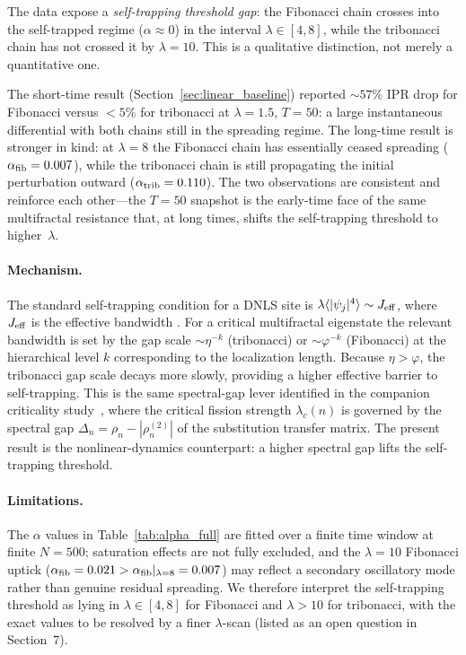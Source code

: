 The data expose a \emph{self-trapping threshold gap}: the Fibonacci
chain crosses into the self-trapped regime ($\alpha \approx 0$) in the
interval $\lambda \in [4, 8]$, while the tribonacci chain has not
crossed it by $\lambda = 10$. This is a qualitative distinction, not
merely a quantitative one.

The short-time result (Section~\ref{sec:linear_baseline}) reported
$\sim\!57\%$ IPR drop for Fibonacci versus $<\!5\%$ for tribonacci at
$\lambda=1.5$, $T=50$: a large instantaneous differential with both
chains still in the spreading regime. The long-time result is stronger
in kind: at $\lambda = 8$ the Fibonacci chain has essentially ceased
spreading ($\alpha_{\rm fib} = 0.007$), while the tribonacci chain is
still propagating the initial perturbation outward
($\alpha_{\rm trib} = 0.110$). The two observations are consistent and
reinforce each other---the $T=50$ snapshot is the early-time face of
the same multifractal resistance that, at long times, shifts the
self-trapping threshold to higher~$\lambda$.

\paragraph{Mechanism.}
The standard self-trapping condition for a DNLS site is
$\lambda \langle |\psi_j|^4 \rangle \sim J_{\rm eff}$, where
$J_{\rm eff}$ is the effective bandwidth
\cite{Eilbeck1985,Kevrekidis2009}. For a critical multifractal
eigenstate the relevant bandwidth is set by the gap scale
$\sim \eta^{-k}$ (tribonacci) or $\sim \varphi^{-k}$ (Fibonacci) at the
hierarchical level $k$ corresponding to the localization length.
Because $\eta > \varphi$, the tribonacci gap scale decays more slowly,
providing a higher effective barrier to self-trapping. This is the
same spectral-gap lever identified in the companion criticality
study~\cite{Grossi2026Criticality}, where the critical fission
strength $\lambda_c(n)$ is governed by the spectral gap
$\Delta_n = \rho_n - |\rho_n^{(2)}|$ of the substitution transfer
matrix. The present result is the nonlinear-dynamics counterpart: a
higher spectral gap lifts the self-trapping threshold.

\paragraph{Limitations.}
The $\alpha$ values in Table~\ref{tab:alpha_full} are fitted over a
finite time window at finite $N=500$; saturation effects are not fully
excluded, and the $\lambda=10$ Fibonacci uptick
($\alpha_{\rm fib} = 0.021 > \alpha_{\rm fib}|_{\lambda=8} = 0.007$)
may reflect a secondary oscillatory mode rather than genuine residual
spreading. We therefore interpret the self-trapping threshold as lying
in $\lambda \in [4, 8]$ for Fibonacci and $\lambda > 10$ for
tribonacci, with the exact values to be resolved by a finer
$\lambda$-scan (listed as an open question in Section~7).

